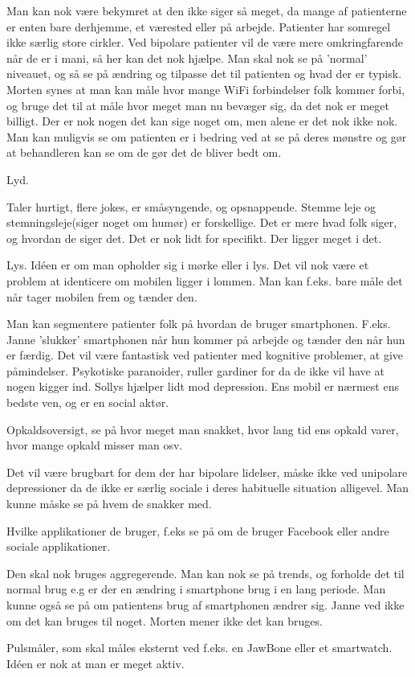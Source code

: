 \begin{description}[style=nextline]
    Man kan nok være bekymret at den ikke siger så meget, da mange af patienterne er enten bare derhjemme, et værested eller på arbejde. Patienter har somregel ikke særlig store cirkler. Ved bipolare patienter vil de være mere omkringfarende når de er i mani, så her kan det nok hjælpe. Man skal nok se på 'normal' niveauet, og så se på ændring og tilpasse det til patienten og hvad der er typisk. Morten synes at man kan måle hvor mange WiFi forbindelser folk kommer forbi, og bruge det til at måle hvor meget man nu bevæger sig, da det nok er meget billigt. Der er nok nogen det kan sige noget om, men alene er det nok ikke nok. Man kan muligvis se om patienten er i bedring ved at se på deres mønstre og gør at behandleren kan se om de gør det de bliver bedt om.
\item[Idé 4] 
    Lyd.
    
    Taler hurtigt, flere jokes, er småsyngende, og opsnappende. Stemme leje og stemningsleje(siger noget om humør) er forskellige. Det er mere hvad folk siger, og hvordan de siger det. Det er nok lidt for specifikt. Der ligger meget i det.
\item[Idé 5]
    Lys. Idéen er om man opholder sig i mørke eller i lys. Det vil nok være et problem at identicere om mobilen ligger i lommen. Man kan f.eks. bare måle det når tager mobilen frem og tænder den. 
    
    Man kan segmentere patienter folk på hvordan de bruger smartphonen. F.eks. Janne 'slukker' smartphonen når hun kommer på arbejde og tænder den når hun er færdig. Det vil være fantastisk ved patienter med kognitive problemer, at give påmindelser. Psykotiske paranoider, ruller gardiner for da de ikke vil have at nogen kigger ind. Sollys hjælper lidt mod depression. Ens mobil er nærmest ens bedste ven, og er en social aktør. 
\item[Idé 6]
    Opkaldsoversigt, se på hvor meget man snakket, hvor lang tid ens opkald varer, hvor mange opkald misser man osv.
    
    Det vil være brugbart for dem der har bipolare lidelser, måske ikke ved unipolare depressioner da de ikke er særlig sociale i deres habituelle situation alligevel. Man kunne måske se på hvem de snakker med.
\item[Idé 7] 
    Hvilke applikationer de bruger, f.eks se på om de bruger Facebook eller andre sociale applikationer. 
    
    Den skal nok bruges aggregerende. Man kan nok se på trends, og forholde det til normal brug e.g er der en ændring i smartphone brug i en lang periode. Man kunne også se på om patientens brug af smartphonen ændrer sig. Janne ved ikke om det kan bruges til noget. Morten mener ikke det kan bruges.
\item[Idé 8]
    Pulsmåler, som skal måles eksternt ved f.eks. en JawBone eller et smartwatch. Idéen er nok at man er meget aktiv.
    

\end{description}
